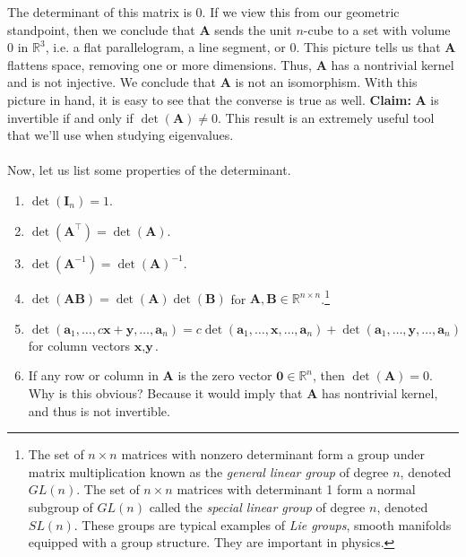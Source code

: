\documentclass{article}
\begin{document}
The determinant of this matrix is 0. If we view this from our geometric standpoint, then we conclude that $\mathbf{A}$ sends the unit $n$-cube to a set with volume 0 in $\mathbb{R}^3$, i.e. a flat parallelogram, a line segment, or 0. This picture tells us that $\mathbf{A}$ flattens space, removing one or more dimensions. Thus, $\mathbf{A}$ has a nontrivial kernel and is not injective. We conclude that $\mathbf{A}$ is not an isomorphism. With this picture in hand, it is easy to see that the converse is true as well. \textbf{Claim:} $\mathbf{A}$ is invertible if and only if $\det(\mathbf{A}) \neq 0$. This result is an extremely useful tool that we'll use when studying eigenvalues. 
\\ \\
Now, let us list some properties of the determinant. 
\begin{enumerate}[label = (\alph*)]
\item $\det(\mathbf{I}_n) = 1$.
\item $\det(\mathbf{A}^\top) = \det(\mathbf{A})$.
\item $\det(\mathbf{A}^{-1}) = \det(\mathbf{A})^{-1}$.
\item $\det(\mathbf{AB}) = \det(\mathbf{A})\det(\mathbf{B})$ for $\mathbf{A,B} \in \mathbb{R}^{n \times n}$.\footnote{The set of $n \times n$ matrices with nonzero determinant form a group under matrix multiplication known as the \textit{general linear group} of degree $n$, denoted $GL(n)$. The set of $n \times n$ matrices with determinant 1 form a normal subgroup of $GL(n)$ called the \textit{special linear group} of degree $n$, denoted $SL(n)$. These groups are typical examples of \textit{Lie groups}, smooth manifolds equipped with a group structure. They are important in physics.}
\item $\det(\textbf{a}_1, \hdots , c\textbf{x}+\textbf{y}, \hdots, \textbf{a}_n) = c\det(\textbf{a}_1, \hdots , \textbf{x}, \hdots, \textbf{a}_n) + \det(\textbf{a}_1, \hdots , \textbf{y}, \hdots, \textbf{a}_n)$ for column vectors $\textbf{x}, \textbf{y}$.
\item If any row or column in $\mathbf{A}$ is the zero vector $\mathbf{0} \in \mathbb{R}^n$, then $\det(\mathbf{A}) = 0$. Why is this obvious? Because it would imply that $\mathbf{A}$ has nontrivial kernel, and thus is not invertible.
\end{enumerate}
\end{document}
